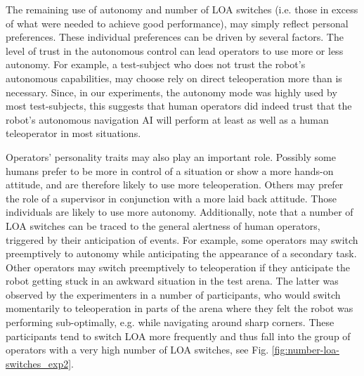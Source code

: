 \documentclass[a4paper,12pt,oneside,openright]{bhamthesis}
\begin{document}
The remaining use of autonomy and number of LOA switches (i.e. those in excess of what were needed to achieve good performance), may simply reflect personal preferences. These individual preferences can be driven by several factors. The level of trust in the autonomous control can lead operators to use more or less autonomy. For example, a test-subject who does not trust the robot's autonomous capabilities, may choose rely on direct teleoperation more than is necessary. Since, in our experiments, the autonomy mode was highly used by most test-subjects, this suggests that human operators did indeed trust that the robot's autonomous navigation AI will perform at least as well as a human teleoperator in most situations.

Operators' personality traits may also play an important role. Possibly some humans prefer to be more in control of a situation or show a more hands-on attitude, and are therefore likely to use more teleoperation. Others may prefer the role of a supervisor in conjunction with a more laid back attitude. Those individuals are likely to use more autonomy. Additionally, note that a number of LOA switches can be traced to the general alertness of human operators, triggered by their anticipation of events. For example, some operators may switch preemptively to autonomy while anticipating the appearance of a secondary task. Other operators may switch preemptively to teleoperation if they anticipate the robot getting stuck in an awkward situation in the test arena. The latter was observed by the experimenters in a number of participants, who would switch momentarily to teleoperation in parts of the arena where they felt the robot was performing sub-optimally, e.g. while navigating around sharp corners. These participants tend to switch LOA more frequently and thus fall into the group of operators with a very high number of LOA switches, see Fig. \ref{fig:number-loa-switches_exp2}. 
\end{document}
